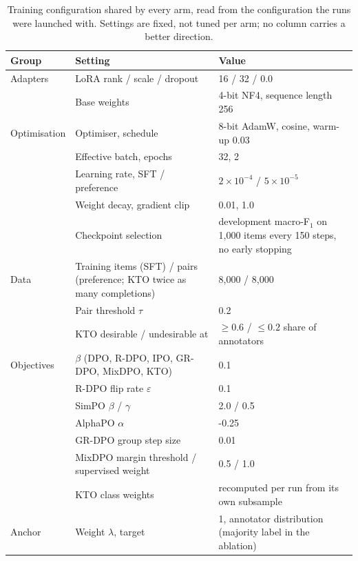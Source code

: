 \begin{table}[t]
\centering
\caption{Training configuration shared by every arm, read from the configuration the runs were launched with. Settings are fixed, not tuned per arm; no column carries a better direction.}
\label{tab:hyperparameters}
\footnotesize
\begin{tabular}{lp{5.4cm}p{6.2cm}}
\toprule
Group & Setting & Value \\
\midrule
Adapters & LoRA rank / scale / dropout & 16 / 32 / 0.0 \\
 & Base weights & 4-bit NF4, sequence length 256 \\
Optimisation & Optimiser, schedule & 8-bit AdamW, cosine, warm-up 0.03 \\
 & Effective batch, epochs & 32, 2 \\
 & Learning rate, SFT / preference & $2 \times 10^{-4}$ / $5 \times 10^{-5}$ \\
 & Weight decay, gradient clip & 0.01, 1.0 \\
 & Checkpoint selection & development macro-F$_1$ on 1{,}000 items every 150 steps, no early stopping \\
Data & Training items (SFT) / pairs (preference; KTO twice as many completions) & 8{,}000 / 8{,}000 \\
 & Pair threshold $\tau$ & 0.2 \\
 & KTO desirable / undesirable at & $\ge 0.6$ / $\le 0.2$ share of annotators \\
Objectives & $\beta$ (DPO, R-DPO, IPO, GR-DPO, MixDPO, KTO) & 0.1 \\
 & R-DPO flip rate $\varepsilon$ & 0.1 \\
 & SimPO $\beta$ / $\gamma$ & 2.0 / 0.5 \\
 & AlphaPO $\alpha$ & -0.25 \\
 & GR-DPO group step size & 0.01 \\
 & MixDPO margin threshold / supervised weight & 0.5 / 1.0 \\
 & KTO class weights & recomputed per run from its own subsample \\
Anchor & Weight $\lambda$, target & 1, annotator distribution (majority label in the ablation) \\
\bottomrule
\end{tabular}
\end{table}
